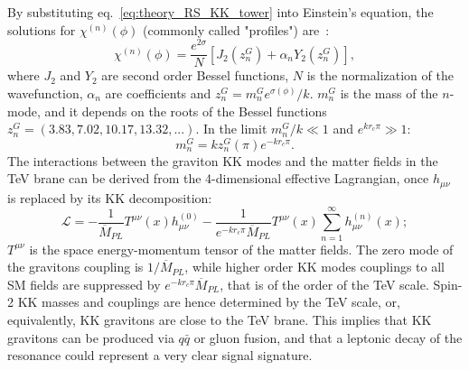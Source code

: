 By substituting eq.~\ref{eq:theory_RS_KK_tower} into Einstein's equation, the solutions for $\chi^{(n)}(\phi)$ (commonly called "profiles") are~\cite{Davoudiasl:1999jd,Gherghetta:2000qt}:
\begin{equation}
\chi^{(n)}(\phi) = \frac{e^{2 \sigma}}{N} \left[ J_2(z_n^G) + \alpha_n Y_2(z_n^G) \right],
\label{eq:theory_RS_KK_tower_profile}
\end{equation}
where $J_2$ and $Y_2$ are second order Bessel functions, $N$ is the normalization of the wavefunction, $\alpha_n$ are coefficients and $z_n^G = m_n^G e^{\sigma(\phi)}/k$. $m_n^G$ is the mass of the $n$-mode, and it depends on the roots of the Bessel functions $z_n^G = \left( 3.83, 7.02, 10.17, 13.32, ... \right)$. In the limit $m_n^G/k \ll 1$ and $e^{k r_c \pi} \gg 1$:
\begin{equation}
m_n^G = k z_n^G(\pi) e^{-k r_c \pi}.
\label{eq:theory_RS_KK_tower_mass}
\end{equation}
The interactions between the graviton KK modes and the matter fields in the TeV brane can be derived from the 4-dimensional effective Lagrangian, once $h_{\mu \nu}$ is replaced by its KK decomposition:
\begin{equation}
\mathcal{L} = - \frac{1}{\overline{M}_{PL}} T^{\mu \nu}(x) h_{\mu \nu}^{(0)} - \frac{1}{e^{-k r_c \pi} \overline{M}_{PL}} T^{\mu \nu}(x) \sum_{n=1}^{\infty}h_{\mu \nu}^{(n)}(x);
\label{eq:theory_RS_KK_lagrangian}
\end{equation}
$T^{\mu \nu}$ is the space energy-momentum tensor of the matter fields. The zero mode of the gravitons coupling is $1/\overline{M}_{PL}$, while higher order KK modes couplings to all SM fields are suppressed by $e^{-k r_c \pi} \overline{M}_{PL}$, that is of the order of the TeV scale. Spin-2 KK masses and couplings are hence determined by the TeV scale, or, equivalently, KK gravitons are close to the TeV brane. This implies that KK gravitons can be produced via $q \bar{q}$ or gluon fusion, and that a leptonic decay of the resonance could represent a very clear signal signature.

